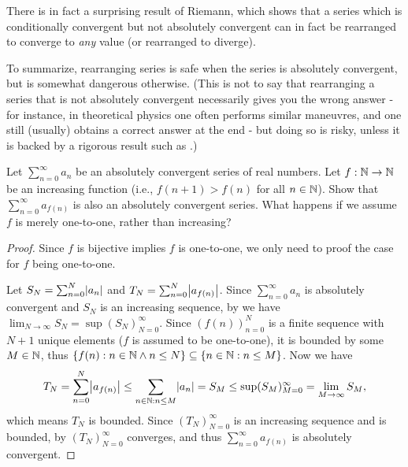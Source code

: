 \begin{note}
  There is in fact a surprising result of Riemann, which shows that a series which is conditionally convergent but not absolutely convergent can in fact be rearranged to converge to \emph{any} value
  (or rearranged to diverge).
\end{note}

\begin{note}
  To summarize, rearranging series is safe when the series is absolutely convergent, but is somewhat dangerous otherwise.
  (This is not to say that rearranging a series that is not absolutely convergent necessarily gives you the wrong answer
  - for instance, in theoretical physics one often performs similar maneuvres, and one still (usually) obtains a correct answer at the end
  - but doing so is risky, unless it is backed by a rigorous result such as .)
\end{note}

\exercisesection

\begin{ex}\label{i:ex:7.4.1}
  Let \(\sum_{n = 0}^\infty a_n\) be an absolutely convergent series of real numbers.
  Let \(f : \mathbb{N} \to \mathbb{N}\) be an increasing function (i.e., \(f(n + 1) > f(n)\) for all \(n \in \mathbb{N}\)).
  Show that \(\sum_{n = 0}^\infty a_{f(n)}\) is also an absolutely convergent series.
  What happens if we assume \(f\) is merely one-to-one, rather than increasing?
\end{ex}

\begin{proof}
  Since \(f\) is bijective implies \(f\) is one-to-one, we only need to proof the case for \(f\) being one-to-one.

  Let \(S_N = \sum_{n = 0}^N \abs{a_n}\) and \(T_N = \sum_{n = 0}^N \abs{a_{f(n)}}\).
  Since \(\sum_{n = 0}^\infty a_n\) is absolutely convergent and \(S_N\) is an increasing sequence, by  we have \(\lim_{N \to \infty} S_N = \sup(S_N)_{N = 0}^\infty\).
  Since \((f(n))_{n = 0}^N\) is a finite sequence with \(N + 1\) unique elements (\(f\) is assumed to be one-to-one), it is bounded by some \(M \in \mathbb{N}\), thus \(\left\lbrace f(n) : n \in \mathbb{N} \land n \leq N\right\rbrace \subseteq \left\lbrace n \in \mathbb{N} : n \leq M\right\rbrace\).
  Now we have
  \[
    T_N = \sum_{n = 0}^N \abs{a_{f(n)}} \leq \sum_{n \in \N : n \leq M} \abs{a_n} = S_M \leq \sup(S_M)_{M = 0}^\infty = \lim_{M \to \infty} S_M,
  \]
  which means \(T_N\) is bounded.
  Since \((T_N)_{N = 0}^\infty\) is an increasing sequence and is bounded, by  \((T_N)_{N = 0}^\infty\) converges, and thus \(\sum_{n = 0}^\infty a_{f(n)}\) is absolutely convergent.
\end{proof}


